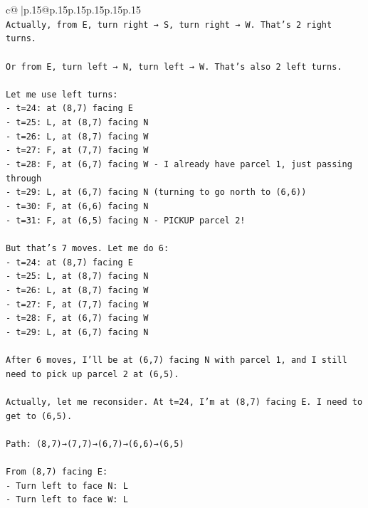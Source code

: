 \documentclass{article}
\begin{document}
{\begin{supertabular}{c@{$\;$}|p{.15\linewidth}@{}p{.15\linewidth}p{.15\linewidth}p{.15\linewidth}p{.15\linewidth}p{.15\linewidth}}
{{{\\ 
\texttt{Actually, from E, turn right → S, turn right → W. That's 2 right turns.} \\
\\ 
\texttt{Or from E, turn left → N, turn left → W. That's also 2 left turns.} \\
\\ 
\texttt{Let me use left turns:} \\
\texttt{{-} t=24: at (8,7) facing E} \\
\texttt{{-} t=25: L, at (8,7) facing N} \\
\texttt{{-} t=26: L, at (8,7) facing W} \\
\texttt{{-} t=27: F, at (7,7) facing W} \\
\texttt{{-} t=28: F, at (6,7) facing W {-} I already have parcel 1, just passing through} \\
\texttt{{-} t=29: L, at (6,7) facing N (turning to go north to (6,6))} \\
\texttt{{-} t=30: F, at (6,6) facing N} \\
\texttt{{-} t=31: F, at (6,5) facing N {-} PICKUP parcel 2!} \\
\\ 
\texttt{But that's 7 moves. Let me do 6:} \\
\texttt{{-} t=24: at (8,7) facing E} \\
\texttt{{-} t=25: L, at (8,7) facing N} \\
\texttt{{-} t=26: L, at (8,7) facing W} \\
\texttt{{-} t=27: F, at (7,7) facing W} \\
\texttt{{-} t=28: F, at (6,7) facing W} \\
\texttt{{-} t=29: L, at (6,7) facing N} \\
\\ 
\texttt{After 6 moves, I'll be at (6,7) facing N with parcel 1, and I still need to pick up parcel 2 at (6,5).} \\
\\ 
\texttt{Actually, let me reconsider. At t=24, I'm at (8,7) facing E. I need to get to (6,5).} \\
\\ 
\texttt{Path: (8,7)→(7,7)→(6,7)→(6,6)→(6,5)} \\
\\ 
\texttt{From (8,7) facing E:} \\
\texttt{{-} Turn left to face N: L} \\
\texttt{{-} Turn left to face W: L} \\
}}}
\end{supertabular}}
\end{document}
